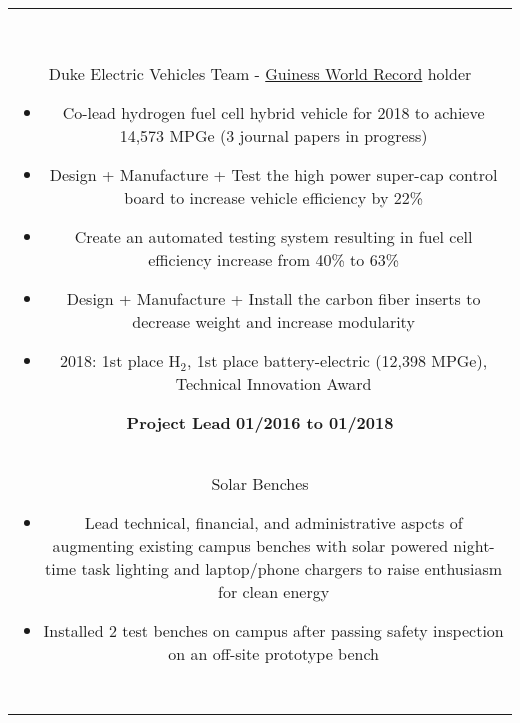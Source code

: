\documentclass[11pt]{amsart}
\newcommand*\ruleline[1]{\par\noindent\raisebox{.8ex}{\makebox[\linewidth]{\hrulefill\hspace{1ex}\raisebox{-.8ex}{\Large~#1~}\hspace{1ex}\hrulefill}}\\ \-\ \vspace{-1em}}
\begin{document}
\begin{center}
\begin{tabular}{c}
	\ruleline{Activities}
	\begin{minipage}{\textwidth}
		{\bf Co-President} \hfill {\bf 08/2015 to Present}\\
		{Duke Electric Vehicles Team - \href{http://www.guinnessworldrecords.com/world-records/most-fuel-efficient-vehicle}{Guiness World Record} holder}
		\begin{itemize}
			\item Co-lead hydrogen fuel cell hybrid vehicle for 2018 to achieve 14,573 MPGe (3 journal papers in progress)
			\item Design + Manufacture + Test the high power super-cap control board to increase vehicle efficiency by 22\%
			\item Create an automated testing system resulting in fuel cell efficiency increase from 40\% to 63\%
			\item Design + Manufacture + Install the carbon fiber inserts to decrease weight and increase modularity
			\item 2018: 1st place H$_2$, 1st place battery-electric (12,398 MPGe), Technical Innovation Award
		\end{itemize}
		{\bf Project Lead} \hfill {\bf 01/2016 to 01/2018}\\
		{Solar Benches}
		\begin{itemize}
			\item Lead technical, financial, and administrative aspcts of augmenting existing campus benches with solar powered night-time task lighting and laptop/phone chargers to raise enthusiasm for clean energy
			\item Installed 2 test benches on campus after passing safety inspection on an off-site prototype bench		\end{itemize}
	\end{minipage}\\~\\
	

\end{tabular}
\end{center}
\end{document}
